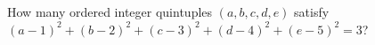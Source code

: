 How many ordered integer quintuples $(a,b,c,d,e)$ satisfy $(a-1)^2+(b-2)^2+(c-3)^2+(d-4)^2+(e-5)^2=3 $?
